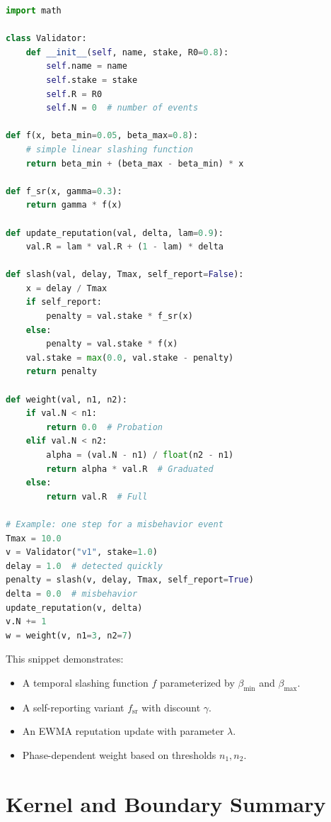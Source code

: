 \documentclass[11pt]{article}
\theoremstyle{plain}
\theoremstyle{definition}
\begin{document}
\begin{lstlisting}[style=code,language=Python,caption={Illustrative pseudocode for temporal slashing and EWMA reputation.}]
import math

class Validator:
    def __init__(self, name, stake, R0=0.8):
        self.name = name
        self.stake = stake
        self.R = R0
        self.N = 0  # number of events

def f(x, beta_min=0.05, beta_max=0.8):
    # simple linear slashing function
    return beta_min + (beta_max - beta_min) * x

def f_sr(x, gamma=0.3):
    return gamma * f(x)

def update_reputation(val, delta, lam=0.9):
    val.R = lam * val.R + (1 - lam) * delta

def slash(val, delay, Tmax, self_report=False):
    x = delay / Tmax
    if self_report:
        penalty = val.stake * f_sr(x)
    else:
        penalty = val.stake * f(x)
    val.stake = max(0.0, val.stake - penalty)
    return penalty

def weight(val, n1, n2):
    if val.N < n1:
        return 0.0  # Probation
    elif val.N < n2:
        alpha = (val.N - n1) / float(n2 - n1)
        return alpha * val.R  # Graduated
    else:
        return val.R  # Full

# Example: one step for a misbehavior event
Tmax = 10.0
v = Validator("v1", stake=1.0)
delay = 1.0  # detected quickly
penalty = slash(v, delay, Tmax, self_report=True)
delta = 0.0  # misbehavior
update_reputation(v, delta)
v.N += 1
w = weight(v, n1=3, n2=7)
\end{lstlisting}

This snippet demonstrates:
\begin{itemize}[leftmargin=*]
  \item A temporal slashing function \(f\) parameterized by \(\beta_{\min}\) and \(\beta_{\max}\).
  \item A self-reporting variant \(f_{\mathrm{sr}}\) with discount \(\gamma\).
  \item An EWMA reputation update with parameter \(\lambda\).
  \item Phase-dependent weight based on thresholds \(n_1, n_2\).
\end{itemize}

\section{Kernel and Boundary Summary}
\end{document}
